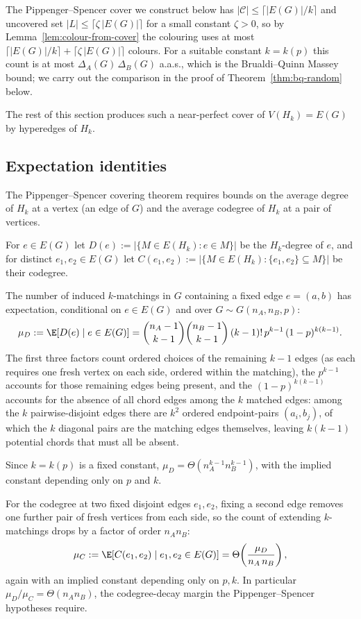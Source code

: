 \documentclass[11pt,a4paper]{article}
\theoremstyle{definition}
\theoremstyle{remark}
\begin{document}
The Pippenger--Spencer cover we construct below has
$|\mathcal{C}| \leq \lceil |E(G)| / k \rceil$ and uncovered set
$|L| \leq \lceil \zeta\,|E(G)| \rceil$ for a small constant
$\zeta > 0$, so by Lemma~\ref{lem:colour-from-cover} the colouring
uses at most $\lceil |E(G)|/k \rceil + \lceil \zeta\,|E(G)|\rceil$
colours. For a suitable constant $k = k(p)$ this count is at most
$\Delta_A(G)\,\Delta_B(G)$ a.a.s., which is the Brualdi--Quinn Massey
bound; we carry out the comparison in the proof of
Theorem~\ref{thm:bq-random} below.

The rest of this section produces such a near-perfect
cover of $V(H_k) = E(G)$ by hyperedges of $H_k$.

\subsection{Expectation identities}

The Pippenger--Spencer covering theorem requires bounds on the
average degree of $H_k$ at a vertex (an edge of $G$) and the average
codegree of $H_k$ at a pair of vertices.

For $e \in E(G)$ let
$D(e) := |\{ M \in E(H_k) : e \in M \}|$
be the $H_k$-degree of $e$, and for distinct $e_1, e_2 \in E(G)$
let
$C(e_1, e_2) := |\{ M \in E(H_k) : \{e_1, e_2\} \subseteq M \}|$
be their codegree.

The number of induced $k$-matchings in $G$ containing a fixed
edge $e = (a, b)$ has expectation, conditional on $e \in E(G)$ and
over $G \sim G(n_A, n_B, p)$:
\[
\mu_D := \E[D(e) \mid e \in E(G)]
= \binom{n_A - 1}{k-1}\binom{n_B - 1}{k-1}\,(k-1)!\,
p^{k-1}\,(1 - p)^{k(k-1)}.
\]
The first three factors count ordered choices of the remaining
$k-1$ edges (as each requires one fresh vertex on each side, ordered
within the matching), the $p^{k-1}$ accounts for those remaining
edges being present, and the $(1-p)^{k(k-1)}$ accounts for the
absence of all chord edges among the $k$ matched edges: among the
$k$ pairwise-disjoint edges there are $k^2$ ordered
endpoint-pairs $(a_i, b_j)$, of which the $k$ diagonal pairs are the
matching edges themselves, leaving $k(k-1)$ potential chords that
must all be absent.

Since $k = k(p)$ is a fixed constant, $\mu_D = \Theta(n_A^{k-1}
n_B^{k-1})$, with the implied constant depending only on $p$ and $k$.

For the codegree at two fixed disjoint edges $e_1, e_2$, fixing a
second edge removes one further pair of fresh vertices from each
side, so the count of extending $k$-matchings drops by a factor of
order $n_A n_B$:
\[
\mu_C := \E[C(e_1, e_2) \mid e_1, e_2 \in E(G)]
= \Theta\!\left(\frac{\mu_D}{n_A\,n_B}\right),
\]
again with an implied constant depending only on $p, k$. In
particular $\mu_D / \mu_C = \Theta(n_A n_B)$, the codegree-decay
margin the Pippenger--Spencer hypotheses require.
\end{document}
